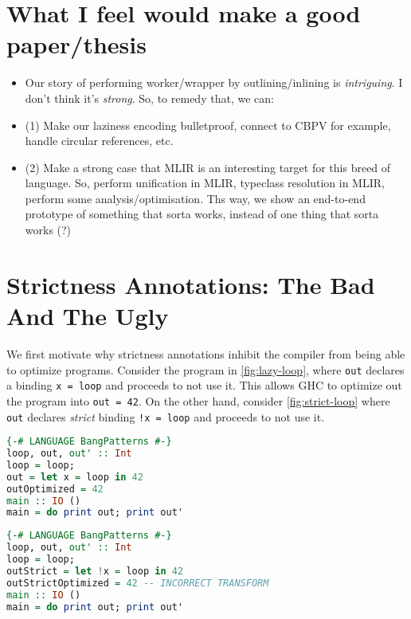\documentclass[sigplan,\review anonymous]{acmart}
\newcommand{\raw}[1]{\texttt{#1}}
\begin{document}
\section{What I feel would make a good paper/thesis}
\begin{itemize}
\item Our story of performing worker/wrapper by outlining/inlining is
\emph{intriguing}. I don't think it's \emph{strong}. So, to remedy that, we can:
\item (1) Make our laziness encoding bulletproof, connect to CBPV for example,
          handle circular references, etc.
\item (2) Make a strong case that MLIR is an interesting target for this breed of language.
          So, perform unification in MLIR, typeclass resolution in MLIR, perform some
          analysis/optimisation. Ths way, we show an end-to-end prototype of something that
          sorta works, instead of one thing that sorta works (?)
\end{itemize}


\section{Strictness Annotations: The Bad And The Ugly}

We first motivate why strictness annotations inhibit the compiler
from being able to optimize programs. Consider the program in
\autoref{fig:lazy-loop}, where \texttt{out} declares
a binding \raw{x = loop} and proceeds to not use it. This allows GHC
to optimize out the program into \raw{out = 42}. On the
other hand, consider  \autoref{fig:strict-loop} where \raw{out}
declares  \emph{strict} binding \raw{!x  = loop} and proceeds to not
use it. 


\begin{lstlisting}[language=haskell,caption=unoptimized \raw{out} and optimized \raw{outOptimized}]
{-# LANGUAGE BangPatterns #-}
loop, out, out' :: Int
loop = loop;
out = let x = loop in 42
outOptimized = 42
main :: IO ()
main = do print out; print out'
\end{lstlisting}

\begin{lstlisting}[language=haskell, caption=unoptimized \raw{outStrict} with an incorrect optimization in \raw{outStrictOptimized}]
{-# LANGUAGE BangPatterns #-}
loop, out, out' :: Int
loop = loop;
outStrict = let !x = loop in 42
outStrictOptimized = 42 -- INCORRECT TRANSFORM
main :: IO ()
main = do print out; print out'
\end{lstlisting}
\end{document}
